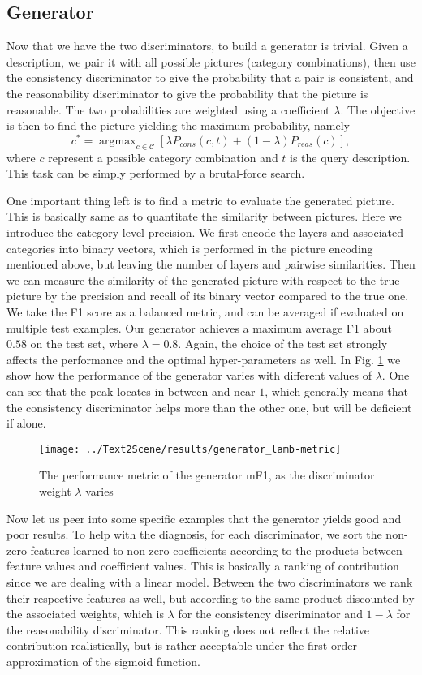 \documentclass{article} %
\begin{document}
\subsection{Generator}
Now that we have the two discriminators, to build a generator is trivial. Given a description, we pair it with all possible pictures (category combinations), then use the consistency discriminator to give the probability that a pair is consistent, and the reasonability discriminator to give the probability that the picture is reasonable. The two probabilities are weighted using a coefficient $\lambda$. The objective is then to find the picture yielding the maximum probability, namely
$$
c^* = \mathop{\arg\max}_{c\in\mathcal{C}} \left[ \lambda P_{cons}(c,t)  + (1-\lambda) P_{reas}(c) \right],
$$
where $c$ represent a possible category combination and $t$ is the query description. This task can be simply performed by a brutal-force search. 

One important thing left is to find a metric to evaluate the generated picture. This is basically same as to quantitate the similarity between pictures. Here we introduce the category-level precision. We first encode the layers and associated categories into binary vectors, which is performed in the picture encoding mentioned above, but leaving the number of layers and pairwise similarities. Then we can measure the similarity of the generated picture with respect to the true picture by the precision and recall of its binary vector compared to the true one. We take the F1 score as a balanced metric, and can be averaged if evaluated on multiple test examples. Our generator achieves a maximum average F1 about $0.58$ on the test set, where $\lambda=0.8$. Again, the choice of the test set strongly affects the performance and the optimal hyper-parameters as well. In Fig. \ref{fig: lamb} we show how the performance of the generator varies with different values of $\lambda$. One can see that the peak locates in between and near $1$, which generally means that the consistency discriminator helps more than the other one, but will be deficient if alone.

\begin{figure}
	\centering
	\texttt{[image: ../Text2Scene/results/generator\_lamb-metric]}
	\caption{The performance metric of the generator mF1, as the discriminator weight $\lambda$ varies}
	\label{fig: lamb}
\end{figure}

Now let us peer into some specific examples that the generator yields good and poor results. To help with the diagnosis, for each discriminator, we sort the non-zero features learned to non-zero coefficients according to the products between feature values and coefficient values. This is basically a ranking of contribution since we are dealing with a linear model. Between the two discriminators we rank their respective features as well, but according to the same product discounted by the associated weights, which is $\lambda$ for the consistency discriminator and $1-\lambda$ for the reasonability discriminator. This ranking does not reflect the relative contribution realistically, but is rather acceptable under the first-order approximation of the sigmoid function.
\end{document}
